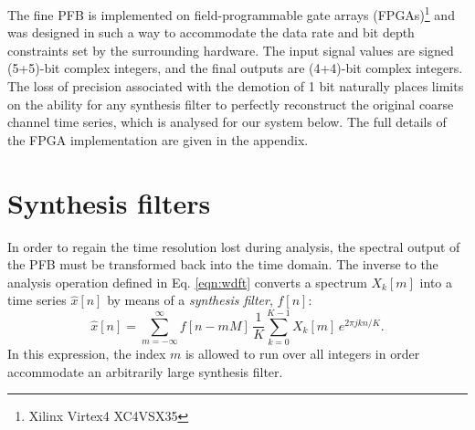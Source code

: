 \documentclass{pasa}%
\begin{document}
The fine PFB is implemented on field-programmable gate arrays (FPGAs)\footnote{Xilinx Virtex4 XC4VSX35} and was designed in such a way to accommodate the data rate and bit depth constraints set by the surrounding hardware.
The input signal values are signed (5+5)-bit complex integers, and the final outputs are (4+4)-bit complex integers.
The loss of precision associated with the demotion of 1 bit naturally places limits on the ability for any synthesis filter to perfectly reconstruct the original coarse channel time series, which is analysed for our system below.
The full details of the FPGA implementation are given in the appendix.

\section{Synthesis filters}
\label{sec:ipfb}

In order to regain the time resolution lost during analysis, the spectral output of the PFB must be transformed back into the time domain.
The inverse to the analysis operation defined in Eq. \eqref{eqn:wdft} converts a spectrum $X_k[m]$ into a time series $\hat{x}[n]$ by means of a \textit{synthesis filter}, $f[n]$:
\begin{equation}
    \hat{x}[n] = \sum_{m = -\infty}^{\infty} f[n - mM]\,
        \frac{1}{K} \sum_{k=0}^{K-1} X_k[m]\,e^{2\pi jkn/K}.
    \label{eqn:ipfb}
\end{equation}
In this expression, the index $m$ is allowed to run over all integers in order accommodate an arbitrarily large synthesis filter.
\end{document}

